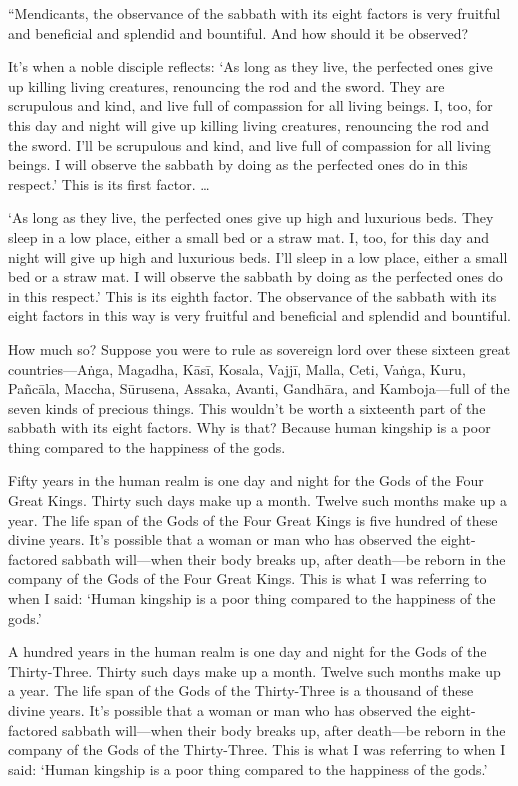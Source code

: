 \documentclass[12pt,openany]{book}%
\begin{document}
“Mendicants, the observance of the sabbath with its eight factors is very fruitful and beneficial and splendid and bountiful. And how should it be observed? 

It’s when a noble disciple reflects: ‘As long as they live, the perfected ones give up killing living creatures, renouncing the rod and the sword. They are scrupulous and kind, and live full of compassion for all living beings. I, too, for this day and night will give up killing living creatures, renouncing the rod and the sword. I’ll be scrupulous and kind, and live full of compassion for all living beings. I will observe the sabbath by doing as the perfected ones do in this respect.’ This is its first factor. … 

‘As long as they live, the perfected ones give up high and luxurious beds. They sleep in a low place, either a small bed or a straw mat. I, too, for this day and night will give up high and luxurious beds. I’ll sleep in a low place, either a small bed or a straw mat. I will observe the sabbath by doing as the perfected ones do in this respect.’ This is its eighth factor. The observance of the sabbath with its eight factors in this way is very fruitful and beneficial and splendid and bountiful. 

How much so? Suppose you were to rule as sovereign lord over these sixteen great countries—\textsanskrit{Aṅga}, Magadha, \textsanskrit{Kāsī}, Kosala, \textsanskrit{Vajjī}, Malla, Ceti, \textsanskrit{Vaṅga}, Kuru, \textsanskrit{Pañcāla}, Maccha, \textsanskrit{Sūrusena}, Assaka, Avanti, \textsanskrit{Gandhāra}, and Kamboja—full of the seven kinds of precious things. This wouldn’t be worth a sixteenth part of the sabbath with its eight factors. Why is that? Because human kingship is a poor thing compared to the happiness of the gods. 

Fifty years in the human realm is one day and night for the Gods of the Four Great Kings. Thirty such days make up a month. Twelve such months make up a year. The life span of the Gods of the Four Great Kings is five hundred of these divine years. It’s possible that a woman or man who has observed the eight-factored sabbath will—when their body breaks up, after death—be reborn in the company of the Gods of the Four Great Kings. This is what I was referring to when I said: ‘Human kingship is a poor thing compared to the happiness of the gods.’ 

A hundred years in the human realm is one day and night for the Gods of the Thirty-Three. Thirty such days make up a month. Twelve such months make up a year. The life span of the Gods of the Thirty-Three is a thousand of these divine years. It’s possible that a woman or man who has observed the eight-factored sabbath will—when their body breaks up, after death—be reborn in the company of the Gods of the Thirty-Three. This is what I was referring to when I said: ‘Human kingship is a poor thing compared to the happiness of the gods.’ 
\end{document}
